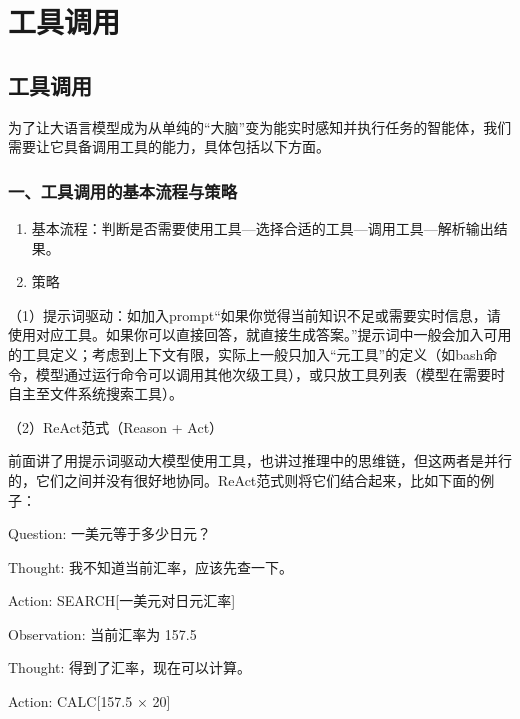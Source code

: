 \hypertarget{ux5de5ux5177ux8c03ux7528}{%
\chapter{工具调用}\label{ux5de5ux5177ux8c03ux7528}}

\hypertarget{ux5de5ux5177ux8c03ux7528-1}{%
\section{工具调用}\label{ux5de5ux5177ux8c03ux7528-1}}

为了让大语言模型成为从单纯的``大脑''变为能实时感知并执行任务的智能体，我们需要让它具备调用工具的能力，具体包括以下方面。

\hypertarget{ux4e00ux5de5ux5177ux8c03ux7528ux7684ux57faux672cux6d41ux7a0bux4e0eux7b56ux7565}{%
\subsection{一、工具调用的基本流程与策略}\label{ux4e00ux5de5ux5177ux8c03ux7528ux7684ux57faux672cux6d41ux7a0bux4e0eux7b56ux7565}}

\begin{enumerate}
\def\labelenumi{\arabic{enumi}.}
\item
  基本流程：判断是否需要使用工具---选择合适的工具---调用工具---解析输出结果。
\item
  策略
\end{enumerate}

（1）提示词驱动：如加入prompt``如果你觉得当前知识不足或需要实时信息，请使用对应工具。如果你可以直接回答，就直接生成答案。''提示词中一般会加入可用的工具定义；考虑到上下文有限，实际上一般只加入``元工具''的定义（如bash命令，模型通过运行命令可以调用其他次级工具），或只放工具列表（模型在需要时自主至文件系统搜索工具）。

（2）ReAct范式（Reason + Act）

前面讲了用提示词驱动大模型使用工具，也讲过推理中的思维链，但这两者是并行的，它们之间并没有很好地协同。ReAct范式则将它们结合起来，比如下面的例子：

Question: 一美元等于多少日元？

Thought: 我不知道当前汇率，应该先查一下。

Action: SEARCH{[}一美元对日元汇率{]}

Observation: 当前汇率为 157.5

Thought: 得到了汇率，现在可以计算。

Action: CALC{[}157.5 × 20{]}

